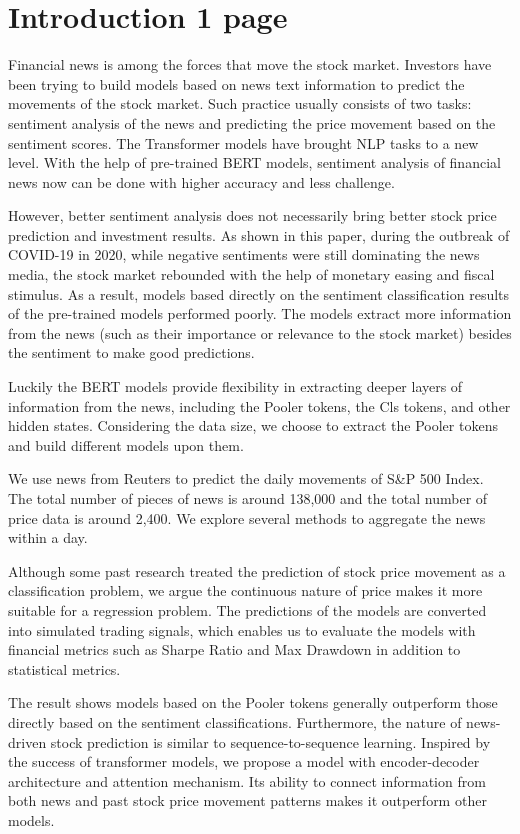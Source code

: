 \documentclass[11pt]{article}
\begin{document}
\section{Introduction 1 page}

Financial news is among the forces that move the stock market. Investors have been trying to build models based on news text information to predict the movements of the stock market. Such practice usually consists of two tasks: sentiment analysis of the news and predicting the price movement based on the sentiment scores. The Transformer models have brought NLP tasks to a new level. With the help of pre-trained BERT models, sentiment analysis of financial news now can be done with higher accuracy and less challenge.

However, better sentiment analysis does not necessarily bring better stock price prediction and investment results. As shown in this paper, during the outbreak of COVID-19 in 2020, while negative sentiments were still dominating the news media, the stock market rebounded with the help of monetary easing and fiscal stimulus. As a result, models based directly on the sentiment classification results of the pre-trained models performed poorly. The models extract more information from the news (such as their importance or relevance to the stock market) besides the sentiment to make good predictions.

Luckily the BERT models provide flexibility in extracting deeper layers of information from the news, including the Pooler tokens, the Cls tokens, and other hidden states. Considering the data size, we choose to extract the Pooler tokens and build different models upon them.

We use news from Reuters to predict the daily movements of S\&P 500 Index. The total number of pieces of news is around 138,000 and the total number of price data is around 2,400. We explore several methods to aggregate the news within a day.

Although some past research treated the prediction of stock price movement as a classification problem, we argue the continuous nature of price makes it more suitable for a regression problem. The predictions of the models are converted into simulated trading signals, which enables us to evaluate the models with financial metrics such as Sharpe Ratio and Max Drawdown in addition to statistical metrics.

The result shows models based on the Pooler tokens generally outperform those directly based on the sentiment classifications. Furthermore, the nature of news-driven stock prediction is similar to sequence-to-sequence learning. Inspired by the success of transformer models, we propose a model with encoder-decoder architecture and attention mechanism. Its ability to connect information from both news and past stock price movement patterns makes it outperform other models.
\end{document}
